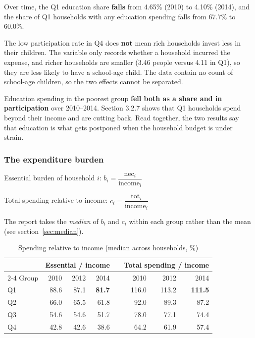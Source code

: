 \documentclass[11pt,a4paper]{article}
\newcommand{\n}[1]{\textbf{#1}}
\begin{document}
Over time, the Q1 education share \n{falls} from 4.65\% (2010) to 4.10\% (2014), and the share of Q1 households with any education spending falls from 67.7\% to 60.0\%.

\begin{luuy}
The low participation rate in Q4 does \n{not} mean rich households invest less in their children. The variable only records whether a household incurred the expense, and richer households are smaller (3.46 people versus 4.11 in Q1), so they are less likely to have a school-age child. The data contain no count of school-age children, so the two effects cannot be separated.
\end{luuy}

\begin{kl}
Education spending in the poorest group \n{fell both as a share and in participation} over 2010–2014. Section 3.2.7 shows that Q1 households spend beyond their income and are cutting back. Read together, the two results say that education is what gets postponed when the household budget is under strain.
\end{kl}

\subsubsection{The expenditure burden}

\begin{ct}
Essential burden of household $i$: \quad $b_i = \dfrac{\text{nec}_i}{\text{income}_i}$
\smallskip

Total spending relative to income: \quad $c_i = \dfrac{\text{tot}_i}{\text{income}_i}$
\smallskip

The report takes the \emph{median} of $b_i$ and $c_i$ within each group rather than the mean (see section~\ref{sec:median}).
\end{ct}

\begin{table}[H]\centering\small
\caption{Spending relative to income (median across households, \%)}
\begin{tabular}{lrrrcrrr}
\toprule
& \multicolumn{3}{c}{Essential / income} & & \multicolumn{3}{c}{Total spending / income}\\
\cmidrule{2-4}\cmidrule{6-8}
Group & 2010 & 2012 & 2014 & & 2010 & 2012 & 2014\\
\midrule
Q1 & 88.6 & 87.1 & \textbf{81.7} & & 116.0 & 113.2 & \textbf{111.5}\\
Q2 & 66.0 & 65.5 & 61.8 & & 92.0 & 89.3 & 87.2\\
Q3 & 54.6 & 54.6 & 51.7 & & 78.0 & 77.1 & 74.4\\
Q4 & 42.8 & 42.6 & 38.6 & & 64.2 & 61.9 & 57.4\\
\bottomrule
\end{tabular}
\end{table}
\end{document}
